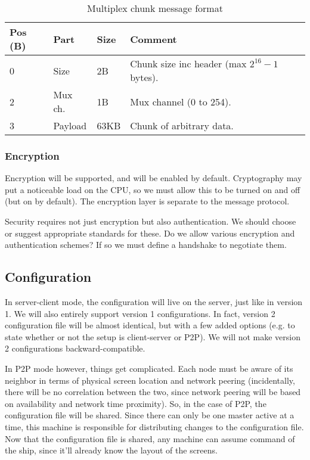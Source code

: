 \begin{table}[ht!]
  \begin{tabular}{|l|l|l|l|l|}
    \hline
    \textbf{Pos (B)} &
    \textbf{Part} &
    \textbf{Size} &
    \textbf{Comment} \\
    \hline
    0 & Size & 2B & Chunk size inc header (max $2^{16}-1$ bytes). \\
    2 & Mux ch. & 1B & Mux channel (0 to 254). \\
    3 & Payload & 63KB & Chunk of arbitrary data. \\
    \hline
  \end{tabular}
  \caption{Multiplex chunk message format}
  \label{tab:muxChunkMessage}
\end{table}

\subsubsection{Encryption}

Encryption will be supported, and will be enabled by default. Cryptography may 
put a noticeable load on the CPU, so we must allow this to be turned on and off
(but on by default). The encryption layer is separate to the message protocol.

Security requires not just encryption but also authentication. We should choose
or suggest appropriate standards for these. Do we allow various encryption and
authentication schemes? If so we must define a handshake to negotiate them.


\subsection{Configuration}

In server-client mode, the configuration will live on the server, just like in
version 1. We will also entirely support version 1 configurations. In fact, 
version 2 configuration file will be almost identical, but with a few added
options (e.g. to state whether or not the setup is client-server or P2P). We 
will not make version 2 configurations backward-compatible.

In P2P mode however, things get complicated. Each node must be aware of its
neighbor in terms of physical screen location and network peering
(incidentally, there will be no correlation between the two, since network 
peering will be based on availability and network time proximity). So, in the
case of P2P, the configuration file will be shared. Since there can only be
one master active at a time, this machine is responsible for distributing
changes to the configuration file. Now that the configuration file is shared,
any machine can assume command of the ship, since it'll already know the layout
of the screens.

